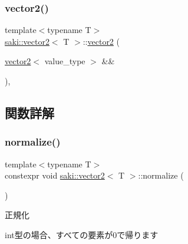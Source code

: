 \mbox{\label{classsaki_1_1vector2_af19b2ba1f8433ef4feeff2cabae128d2}} 
\subsubsection{\texorpdfstring{vector2()}{vector2()}\hspace{0.1cm}{\footnotesize\ttfamily [5/5]}}
{\footnotesize\ttfamily template$<$typename T$>$ \\
\mbox{\hyperlink{classsaki_1_1vector2}{saki\+::vector2}}$<$ T $>$\+::\mbox{\hyperlink{classsaki_1_1vector2}{vector2}} (\begin{DoxyParamCaption}\item[{\mbox{\hyperlink{classsaki_1_1vector2}{vector2}}$<$ value\+\_\+type $>$ \&\&}]{ }\end{DoxyParamCaption})\hspace{0.3cm}{\ttfamily [default]}, {\ttfamily [noexcept]}}



\subsection{関数詳解}
\mbox{\label{classsaki_1_1vector2_a90907529f5891e7395e1253a95e7014d}} 
\subsubsection{\texorpdfstring{normalize()}{normalize()}}
{\footnotesize\ttfamily template$<$typename T$>$ \\
constexpr void \mbox{\hyperlink{classsaki_1_1vector2}{saki\+::vector2}}$<$ T $>$\+::normalize (\begin{DoxyParamCaption}{ }\end{DoxyParamCaption})\hspace{0.3cm}{\ttfamily [inline]}}



正規化 

int型の場合、すべての要素が0で帰ります \mbox{\label{classsaki_1_1vector2_a203906261424323192294dac71cc1f35}} 

